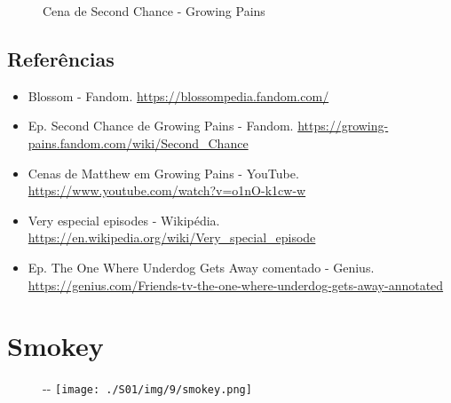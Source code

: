 \begin{figure}
  \centering
    \caption{Cena de Second Chance - Growing Pains\label{fig:cena-de-second-chance-growing-pains}}
\end{figure}

\hypertarget{referuxeancias-3}{%
\subsection{Referências}\label{referuxeancias-3}}

\begin{itemize}
\tightlist
\item
  \sloppy Blossom - Fandom. \url{https://blossompedia.fandom.com/}
\item
  \sloppy Ep. Second Chance de Growing Pains - Fandom. \url{https://growing-pains.fandom.com/wiki/Second_Chance}
\item
  \sloppy Cenas de Matthew em Growing Pains - YouTube. \url{https://www.youtube.com/watch?v=o1nO-k1cw-w}
\item
  \sloppy Very especial episodes - Wikipédia. \url{https://en.wikipedia.org/wiki/Very_special_episode}
\item
  \sloppy Ep. The One Where Underdog Gets Away comentado - Genius. \url{https://genius.com/Friends-tv-the-one-where-underdog-gets-away-annotated}
\end{itemize}

\hypertarget{smokey}{%
\section{Smokey}\label{smokey}}

\begin{figure}[!ht]
  \begin{adjustwidth}{-\oddsidemargin-1in}{-\rightmargin}
    \centering
    \texttt{[image: ./S01/img/9/smokey.png]}
  \end{adjustwidth}
\end{figure}


